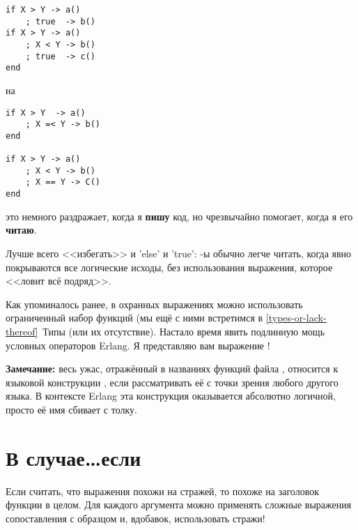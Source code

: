 \begin{lstlisting}[style=erlang]
if X > Y -> a()
    ; true  -> b()
if X > Y -> a()
    ; X < Y -> b()
    ; true  -> c()
end
\end{lstlisting}
\colorbox{lgray}
{
    \begin{minipage}{\linewidth}
на
    \end{minipage}
}
\begin{lstlisting}[style=erlang]     
if X > Y  -> a()
    ; X =< Y -> b()
end

if X > Y -> a()
    ; X < Y -> b()
    ; X == Y -> C()
end
\end{lstlisting}
\colorbox{lgray}
{
    \begin{minipage}{\linewidth}
это немного раздражает, когда я \textbf{пишу} код, но чрезвычайно помогает, когда я его \textbf{читаю}.
    \end{minipage}
}

Лучше всего <<избегать>> и 'else' и 'true': \--ы обычно легче читать, когда явно покрываются все логические исходы, без использования выражения, которое <<ловит всё подряд>>.

Как упоминалось ранее, в охранных выражениях можно использовать ограниченный набор функций (мы ещё с ними встретимся в \ref{types-or-lack-thereof}~Типы (или их отсутствие). Настало время явить подлинную мощь условных операторов Erlang. Я представляю вам выражение !\\
\colorbox{lgray}
{
    \begin{minipage}{\linewidth}
\textbf{Замечание:} весь ужас, отражённый в названиях функций файла , относится к языковой конструкции , если рассматривать её с точки зрения  любого другого языка. В контексте Erlang эта конструкция оказывается абсолютно логичной, просто её имя сбивает с толку.
    \end{minipage}
}
\section{В случае\ldots если}

Если считать, что выражения  похожи на стражей, то  похоже на заголовок функции в целом. Для каждого аргумента можно применять сложные выражения сопоставления с образцом и, вдобавок, использовать стражи!


